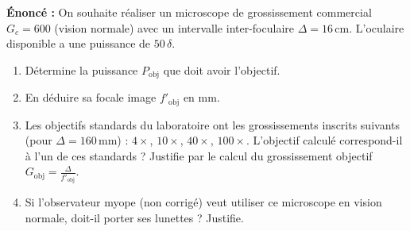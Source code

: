 \documentclass[11pt]{article}
\begin{document}
\begin{exercice}
\textbf{Énoncé :} On souhaite réaliser un microscope de grossissement commercial $G_c = 600$ (vision normale) avec un intervalle inter-foculaire $\Delta = 16\,\text{cm}$. L'oculaire disponible a une puissance de $50\,\delta$.
\begin{enumerate}
    \item Détermine la puissance $P_{\text{obj}}$ que doit avoir l'objectif.
    \item En déduire sa focale image $f'_{\text{obj}}$ en mm.
    \item Les objectifs standards du laboratoire ont les grossissements inscrits suivants (pour $\Delta = 160\,\text{mm}$) : $4\times$, $10\times$, $40\times$, $100\times$. L'objectif calculé correspond-il à l'un de ces standards ? Justifie par le calcul du grossissement objectif $G_{\text{obj}} = \frac{\Delta}{f'_{\text{obj}}}$.
    \item Si l'observateur myope (non corrigé) veut utiliser ce microscope en vision normale, doit-il porter ses lunettes ? Justifie.
\end{enumerate}
\end{exercice}
\end{document}
